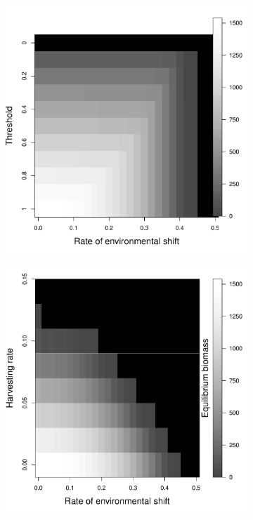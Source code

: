 \documentclass[12pt,english]{article}
\begin{document}
\begin{figure}[htbp]
\begin{subfigure}{.33\textwidth}
\includegraphics[width=\textwidth]{plots/eqbiomass_thresh.pdf}
\end{subfigure}
\begin{subfigure}{.33\textwidth}
\subcaption{}
\includegraphics[width=\textwidth]{plots/eqbiomass_mpa.pdf}
\end{subfigure}
\caption{
}
\label{management}
\end{figure}
\end{document}
